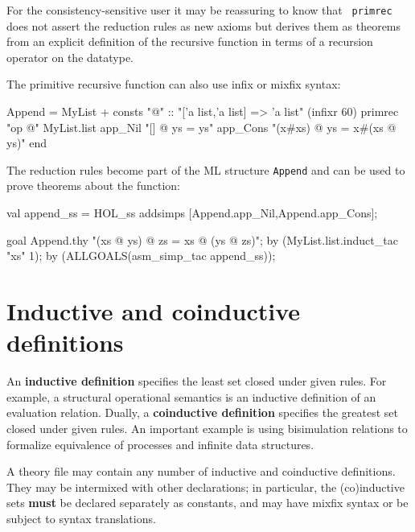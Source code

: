 For the consistency-sensitive user it may be reassuring to know that {\tt
  primrec} does not assert the reduction rules as new axioms but derives them
as theorems from an explicit definition of the recursive function in terms of
a recursion operator on the datatype.

The primitive recursive function can also use infix or mixfix syntax:
\begin{ttbox}
Append = MyList +
consts "@"  :: "['a list,'a list] => 'a list"  (infixr 60)
primrec "op @" MyList.list
   app_Nil   "[] @ ys = ys"
   app_Cons  "(x#xs) @ ys = x#(xs @ ys)"
end
\end{ttbox}

The reduction rules become part of the ML structure \verb$Append$ and can
be used to prove theorems about the function:
\begin{ttbox}
val append_ss = HOL_ss addsimps [Append.app_Nil,Append.app_Cons];

goal Append.thy "(xs @ ys) @ zs = xs @ (ys @ zs)";
by (MyList.list.induct_tac "xs" 1);
by (ALLGOALS(asm_simp_tac append_ss));
\end{ttbox}




\section{Inductive and coinductive definitions}

An {\bf inductive definition} specifies the least set closed under given
rules.  For example, a structural operational semantics is an inductive
definition of an evaluation relation.  Dually, a {\bf coinductive
  definition} specifies the greatest set closed under given rules.  An
important example is using bisimulation relations to formalize equivalence
of processes and infinite data structures.

A theory file may contain any number of inductive and coinductive
definitions.  They may be intermixed with other declarations; in
particular, the (co)inductive sets {\bf must} be declared separately as
constants, and may have mixfix syntax or be subject to syntax translations.

